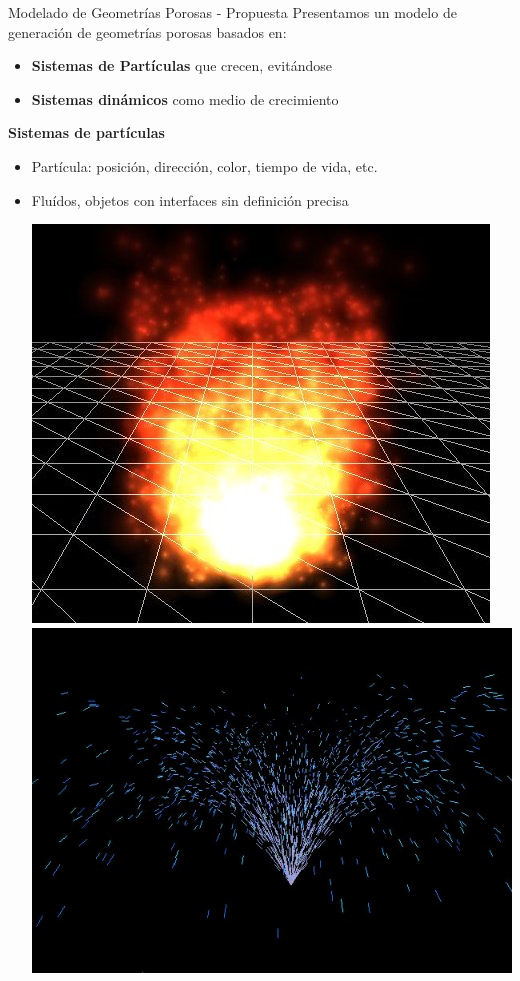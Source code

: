 \documentclass[spanish,unknownkeysallowed]{beamer}
\begin{document}
\begin{frame}{Modelado de Geometrías Porosas - Propuesta}
Presentamos un modelo de generación de geometrías porosas basados en:
\begin{itemize}
\item \textbf{Sistemas de Partículas} que crecen, evitándose
\item \textbf{Sistemas dinámicos} como medio de crecimiento
\end{itemize}

\vspace{0.4cm}

\textbf{Sistemas de partículas}
\begin{itemize}
\item Partícula: posición, dirección, color, tiempo de vida, etc.
\item Fluídos, objetos con interfaces sin definición precisa

\includegraphics[scale = 0.216]{../figures/fire}
\includegraphics[scale = 0.2]{../figures/fireworks}
\end{itemize}
\end{frame}
\end{document}
